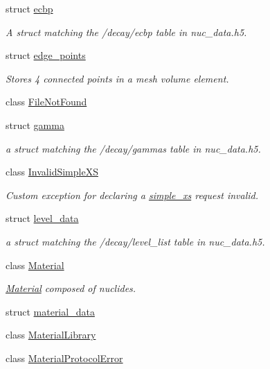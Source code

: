 \begin{DoxyCompactItemize}
struct \hyperlink{structpyne_1_1ecbp}{ecbp}
\begin{DoxyCompactList}\small\item\em A struct matching the \textquotesingle{}/decay/ecbp\textquotesingle{} table in nuc\+\_\+data.\+h5. \end{DoxyCompactList}\item 
struct \hyperlink{structpyne_1_1edge__points}{edge\+\_\+points}
\begin{DoxyCompactList}\small\item\em Stores 4 connected points in a mesh volume element. \end{DoxyCompactList}\item 
class \hyperlink{classpyne_1_1_file_not_found}{File\+Not\+Found}
\item 
struct \hyperlink{structpyne_1_1gamma}{gamma}
\begin{DoxyCompactList}\small\item\em a struct matching the \textquotesingle{}/decay/gammas\textquotesingle{} table in nuc\+\_\+data.\+h5. \end{DoxyCompactList}\item 
class \hyperlink{classpyne_1_1_invalid_simple_x_s}{Invalid\+Simple\+XS}
\begin{DoxyCompactList}\small\item\em Custom exception for declaring a \hyperlink{structsimple__xs}{simple\+\_\+xs} request invalid. \end{DoxyCompactList}\item 
struct \hyperlink{structpyne_1_1level__data}{level\+\_\+data}
\begin{DoxyCompactList}\small\item\em a struct matching the \textquotesingle{}/decay/level\+\_\+list\textquotesingle{} table in nuc\+\_\+data.\+h5. \end{DoxyCompactList}\item 
class \hyperlink{classpyne_1_1_material}{Material}
\begin{DoxyCompactList}\small\item\em \hyperlink{classpyne_1_1_material}{Material} composed of nuclides. \end{DoxyCompactList}\item 
struct \hyperlink{structpyne_1_1material__data}{material\+\_\+data}
\item 
class \hyperlink{classpyne_1_1_material_library}{Material\+Library}
\item 
class \hyperlink{classpyne_1_1_material_protocol_error}{Material\+Protocol\+Error}

\end{DoxyCompactItemize}
